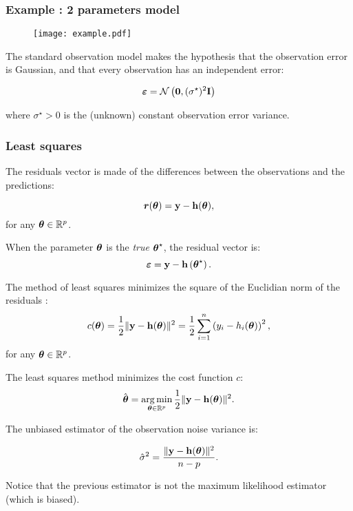 \documentclass[aspectratio=169]{beamer}
\begin{document}

\begin{frame}
\frametitle{Example : 2 parameters model}
\begin{figure}
\centering
\texttt{[image: example.pdf]}
\end{figure}

\end{frame}


\begin{frame}
The standard observation model makes the hypothesis that the observation error is Gaussian, and that every observation has an independent error:

$$
\boldsymbol{\varepsilon} = \mathcal{N}\left({\bf 0}, (\sigma^\star)^2 {\bf I}\right)
$$

where $\sigma^\star > 0$ is the (unknown) constant observation error
variance.

\end{frame}


\begin{frame}
\frametitle{Least squares}

The residuals vector is made of the differences between the observations 
and the predictions:

$$
\boldsymbol{r}(\boldsymbol{\theta}) = {\bf y} - {\bf h}(\boldsymbol{\theta}),
$$
for any $\boldsymbol{\theta} \in\mathbb{R}^p$. 

When the parameter $\boldsymbol{\theta}$ is the \emph{true} $\boldsymbol{\theta}^\star$, the residual 
vector is:
$$
\boldsymbol{\varepsilon} = {\bf y} - {\bf h}\left(\boldsymbol{\theta}^\star\right).
$$


The method of least squares minimizes the square
of the Euclidian norm of the residuals \cite{Bjorck1996}:
$$
c(\boldsymbol{\theta}) 
= \frac{1}{2} \|{\bf y} - {\bf h}(\boldsymbol{\theta})\|^2 
= \frac{1}{2} \sum_{i=1}^n \left( y_i - h_i(\boldsymbol{\theta}) \right)^2,
$$
for any $\boldsymbol{\theta} \in \mathbb{R}^p$.


\end{frame}


\begin{frame}
The least squares method minimizes the cost function $c$:
$$
\hat{\boldsymbol{\theta}} 
= \operatorname*{arg\,min}_{\boldsymbol{\theta} \in \mathbb{R}^p} \frac{1}{2} \|{\bf y} - {\bf h}(\boldsymbol{\theta})\|^2.
$$

\vspace{30pt}

The unbiased estimator of the observation noise variance is:

$$
\hat{\sigma}^2 = \frac{\|{\bf y} - {\bf h}(\boldsymbol{\theta})\|^2}{n - p}.
$$

Notice that the previous estimator is not the maximum likelihood
estimator (which is biased).
\end{frame}
\end{document}
